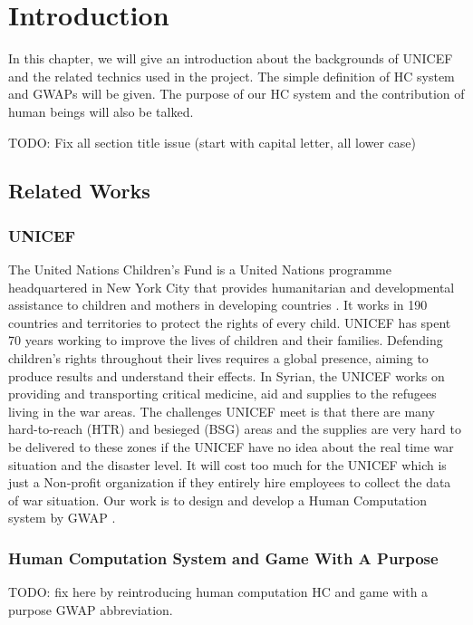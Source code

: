 \section{Introduction}

In this chapter, we will give an introduction about the backgrounds of UNICEF and the related technics 
used in the project. The simple definition of HC system and GWAPs will be given. 
The purpose of our HC system and the contribution of human beings will also be talked.

TODO: Fix all section title issue (start with capital letter, all lower case)

\subsection{Related Works}

\subsubsection{UNICEF}
The United Nations Children's Fund \cite{unicef1994state} is a United Nations programme headquartered
in New York City that provides humanitarian and developmental assistance to 
children and mothers in developing countries \cite{wiki:UNICEF}.
It works in 190 countries and territories to protect the rights of every child. 
UNICEF has spent 70 years working to improve the lives of children and their families. 
Defending children's rights throughout their lives requires a global presence, 
aiming to produce results and understand their effects. 
In Syrian, the UNICEF works on providing and transporting critical medicine, 
aid and supplies to the refugees living in the war areas. The challenges UNICEF meet is that 
there are many hard-to-reach (HTR) and besieged (BSG) areas and the supplies are 
very hard to be delivered to these zones if the UNICEF have no idea about 
the real time war situation and the disaster level. It will cost too much for the UNICEF 
which is just a Non-profit organization if they entirely hire employees to 
collect the data of war situation. 
Our work is to design and develop a Human Computation system by GWAP \cite{lafourcade2015games}.

\subsubsection{Human Computation System and Game With A Purpose}
TODO: fix here by reintroducing human computation HC and game with a purpose GWAP abbreviation.

